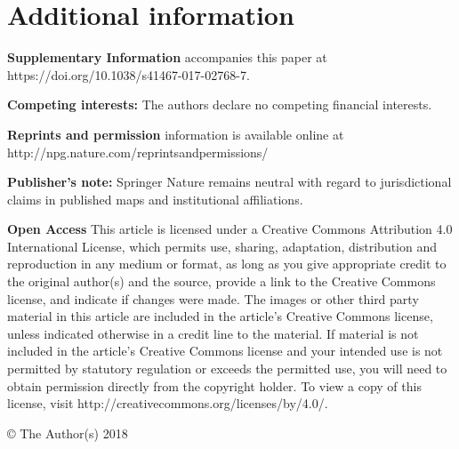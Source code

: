\documentclass{article}
\begin{document}
\section*{Additional information}

\textbf{Supplementary Information} accompanies this paper at https://doi.org/10.1038/s41467-017-02768-7.

\textbf{Competing interests:} The authors declare no competing financial interests.

\textbf{Reprints and permission} information is available online at http://npg.nature.com/reprintsandpermissions/

\textbf{Publisher's note:} Springer Nature remains neutral with regard to jurisdictional claims in published maps and institutional affiliations.

\textbf{Open Access} This article is licensed under a Creative Commons Attribution 4.0 International License, which permits use, sharing, adaptation, distribution and reproduction in any medium or format, as long as you give appropriate credit to the original author(s) and the source, provide a link to the Creative Commons license, and indicate if changes were made. The images or other third party material in this article are included in the article’s Creative Commons license, unless indicated otherwise in a credit line to the material. If material is not included in the article’s Creative Commons license and your intended use is not permitted by statutory regulation or exceeds the permitted use, you will need to obtain permission directly from the copyright holder. To view a copy of this license, visit http://creativecommons.org/licenses/by/4.0/.

© The Author(s) 2018
\end{document}
